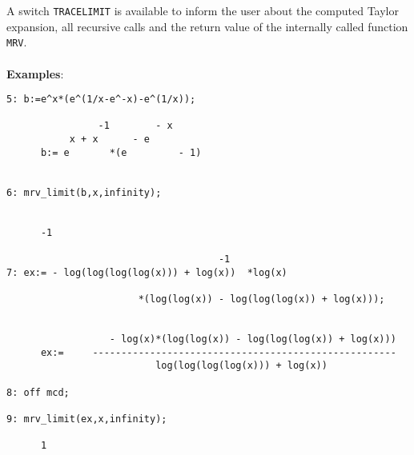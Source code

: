 A switch {\tt TRACELIMIT} is available to inform the user about the computed
Taylor expansion, all recursive calls and the return value of the
internally called function {\tt MRV}. \\
\\
{\bf Examples}:
\\
\begin{verbatim}
5: b:=e^x*(e^(1/x-e^-x)-e^(1/x));

                -1        - x
           x + x      - e
      b:= e       *(e         - 1)


6: mrv_limit(b,x,infinity);


      -1

                                     -1
7: ex:= - log(log(log(log(x))) + log(x))  *log(x)

                       *(log(log(x)) - log(log(log(x)) + log(x)));


                  - log(x)*(log(log(x)) - log(log(log(x)) + log(x)))
      ex:=     -----------------------------------------------------
                          log(log(log(log(x))) + log(x))

8: off mcd;

9: mrv_limit(ex,x,infinity);

      1

\end{verbatim}
